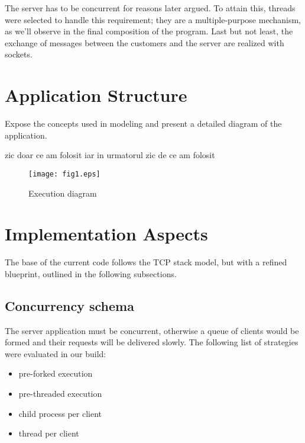 \documentclass[runningheads]{llncs}
\begin{document}
The server has to be concurrent for reasons later argued. To attain this, threads were selected to handle this requirement; they are a multiple-purpose mechanism, as we'll observe in the final composition of the program. Last but not least, the exchange of messages between the customers and the server are realized with sockets.


\section{Application Structure}

Expose the concepts used in modeling and present a detailed diagram of the application.

zic doar ce am folosit iar in urmatorul zic  de ce am folosit
    
\begin{figure}[!h]
    \texttt{[image: fig1.eps]}
    \caption{Execution diagram} \label{fig1}
\end{figure}


\section{Implementation Aspects}

The base of the current code follows the TCP stack model, but with a refined blueprint, outlined in the following subsections. 

\subsection{Concurrency schema}

The server application must be concurrent, otherwise a queue of clients would be formed and their requests will be delivered slowly. The following list of strategies were evaluated in our build:
\begin{itemize}
    \item pre-forked execution 
    \item pre-threaded execution 
    \item child process per client
    \item thread per client
\end{itemize}
\end{document}
